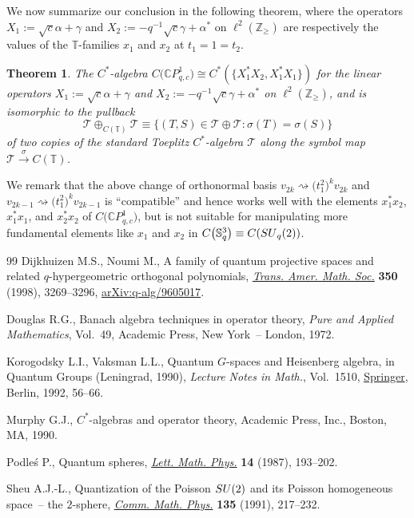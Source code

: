 \documentclass[11pt]{article}
\numberwithin{equation}{section}
\newtheorem{theorem}{Theorem}
\begin{document}
We now summarize our conclusion in the following theorem, where the operators
$X_{1}:=\sqrt{c}\alpha+\gamma$ and $X_{2}:=-q^{-1}\sqrt{c}\gamma+\alpha^{\ast
}$ on $\ell^{2} ( \mathbb{Z}_{\geq} ) $ are respectively the values
of the $\mathbb{T}$-families $x_{1}$ and $x_{2}$ at $t_{1}=1=t_{2}$.

\begin{theorem}\label{final} The $C^*$-algebra $C\big( \mathbb{C}P_{q,c}^{1}\big)
\cong C^{\ast} ( \{ X_{1}^{\ast}X_{2},X_{1}^{\ast}X_{1} \}
 ) $ for the linear operators $X_{1}:=\sqrt{c}\alpha+\gamma$ and
$X_{2}:=-q^{-1}\sqrt{c}\gamma+\alpha^{\ast}$ on $\ell^{2} (
\mathbb{Z}_{\geq} ) $, and is isomorphic to the pullback
\[
\mathcal{T}\oplus_{C ( \mathbb{T} ) }\mathcal{T}\equiv\big\{
 ( T,S ) \in\mathcal{T}\oplus\mathcal{T}\colon \sigma(T)
=\sigma ( S ) \big\}
\]
of two copies of the standard Toeplitz $C^*$-algebra $\mathcal{T}$ along the
symbol map $\mathcal{T}\overset{\sigma}{\rightarrow}C( \mathbb{T})$.
\end{theorem}

We remark that the above change of orthonormal basis $v_{2k}\rightsquigarrow
\big( t_{1}^{2}\big) ^{k}v_{2k}$ and $v_{2k-1}\rightsquigarrow\big(
t_{1}^{2}\big) ^{k}v_{2k-1}$ is ``compatible'' and hence works well with the elements
$x_{1}^{\ast}x_{2}$, $x_{1}^{\ast}x_{1}$, and $x_{2}^{\ast}x_{2}$ of $C\big(
\mathbb{C}P_{q,c}^{1}\big) $, but is not suitable for manipulating more
fundamental elements like $x_{1}$ and $x_{2}$ in $C\big( \mathbb{S}_{q}^{3}\big) \equiv C( {\rm SU}_{q}(2)) $.
\begin{thebibliography}{99}
Dijkhuizen M.S., Noumi M., A family of quantum projective spaces and related
 {$q$}-hypergeometric orthogonal polynomials, \href{https://doi.org/10.1090/S0002-9947-98-01971-0}{\textit{Trans. Amer. Math. Soc.}}
 \textbf{350} (1998), 3269--3296, \href{https://arxiv.org/abs/q-alg/9605017}{arXiv:q-alg/9605017}.

Douglas R.G., Banach algebra techniques in operator theory, \textit{Pure and
 Applied Mathematics}, Vol.~49, Academic Press, New York~-- London, 1972.

Korogodsky L.I., Vaksman L.L., Quantum {$G$}-spaces and {H}eisenberg algebra,
 in Quantum Groups ({L}eningrad, 1990), \textit{Lecture Notes in Math.}, Vol.~1510, \href{https://doi.org/10.1007/BFb0101178}{Springer}, Berlin, 1992, 56--66.

Murphy G.J., {$C^*$}-algebras and operator theory, Academic Press, Inc.,
 Boston, MA, 1990.

Podle\'s P., Quantum spheres, \href{https://doi.org/10.1007/BF00416848}{\textit{Lett. Math. Phys.}} \textbf{14} (1987),
 193--202.

Sheu A.J.-L., Quantization of the {P}oisson {${\rm SU}(2)$} and its {P}oisson
 homogeneous space~-- the {$2$}-sphere, \href{https://doi.org/10.1007/BF02098041}{\textit{Comm. Math. Phys.}}
 \textbf{135} (1991), 217--232.

\end{thebibliography}
\end{document}
